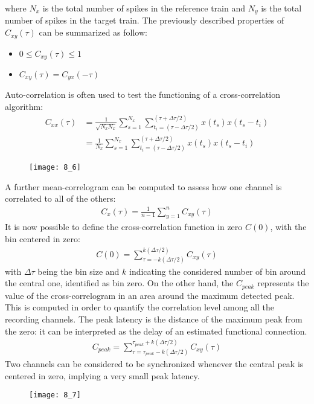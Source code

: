 where \(N_x\) is the total number of spikes in the reference train and \(N_y\) is the
total number of spikes in the target train. The previously described properties of
\(C_{xy}(\tau)\) can be summarized as follow:
\begin{itemize}
    \item \(0\le{C_{xy}(\tau)}\le{1}\)
    \item \(C_{xy}(\tau)=C_{yx}(-\tau)\)
\end{itemize}
Auto-correlation is often used to test the functioning of a cross-correlation
algorithm:
\begin{align*}
    C_{xx}(\tau)
     & =\frac{1}{\sqrt{N_xN_x}}\sum_{s=1}^{N_x}\sum_{t_{i}=(\tau-\Delta{\tau}/2)}^{(\tau+\Delta{\tau}/2)}x(t_s)x(t_s-t_i) \\
     & =\frac{1}{N_x}\sum_{s=1}^{N_x}\sum_{t_{i}=(\tau-\Delta{\tau}/2)}^{(\tau+\Delta{\tau}/2)}x(t_s)x(t_s-t_i)
\end{align*}
\begin{figure}[H]
    \texttt{[image: 8\_6]}
    \centering
\end{figure}
A further mean-correlogram can be computed to assess how one channel is correlated
to all of the others:
\begin{align*}
    C_x(\tau)=\frac{1}{n-1}\sum_{y=1}^{n}C_{xy}(\tau)
\end{align*}
It is now possible to define the cross-correlation function in zero \(C(0)\), with
the bin centered in zero:
\begin{align*}
    C(0)=\sum_{\tau=-k(\Delta\tau/2)}^{k(\Delta\tau/2)}C_{xy}(\tau)
\end{align*}
with \(\Delta\tau\) being the bin size and \(k\) indicating the considered number of
bin around the central one, identified as bin zero.
On the other hand, the \(C_{peak}\) represents the value of the cross-correlogram in
an area around the maximum detected peak. This is computed in order to quantify the
correlation level among all the recording channels. The peak latency is the distance
of the maximum peak from the zero: it can be interpreted as the delay of an
estimated functional connection.
\begin{align*}
    C_{peak}=\sum_{\tau=\tau_{peak}-k(\Delta\tau/2)}^{\tau_{peak}+k(\Delta\tau/2)}C_{xy}(\tau)
\end{align*}
Two channels can be considered to be synchronized whenever the central peak is
centered in zero, implying a very small peak latency.
\begin{figure}[H]
    \texttt{[image: 8\_7]}
    \centering
\end{figure}

